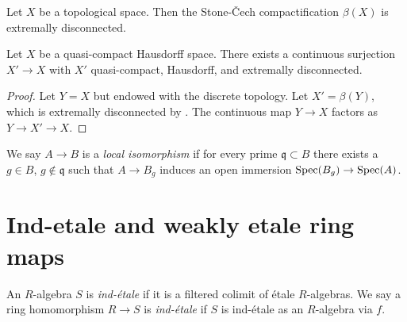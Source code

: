 \begin{theorem}
    Let \(X\) be a topological space. Then the Stone-Čech compactification \(\beta(X)\) is extremally disconnected.
    \label{thm:stone-cech-extremally-disconnected}
    \mathlibok
\end{theorem}

\begin{proposition}
  Let $X$ be a quasi-compact Hausdorff space. There exists a continuous surjection $X' \to X$ with $X'$ quasi-compact, Hausdorff, and extremally disconnected.
  \label{thm:extremally-disconnected-cover}
\end{proposition}

\begin{proof}
  Let $Y=X$ but endowed with the discrete topology. Let $X'=\beta (Y)$, which is extremally disconnected by . The continuous map $Y \to X$ factors as $Y \to X' \to X$. 
\end{proof}

\begin{definition}
  \label{def:local-isomorphism}

  We say $A \to B$ is a \emph{local isomorphism} if for every prime $\mathfrak{q} \subset B$ there exists a $g \in B$, $g \notin \mathfrak{q}$ such that $A \to B_g$ induces an open immersion $\operatorname{Spec} (B_g) \to \operatorname{Spec} (A)$.
\end{definition}

\section{Ind-etale and weakly etale ring maps}

\begin{definition}
    An $R$-algebra $S$ is \emph{ind-étale} if it is a filtered colimit of étale $R$-algebras.
    We say a ring homomorphism $R \to S$ is \emph{ind-étale} if $S$ is ind-étale as an $R$-algebra via $f$.
    \label{def:ind-etale}
\end{definition}

